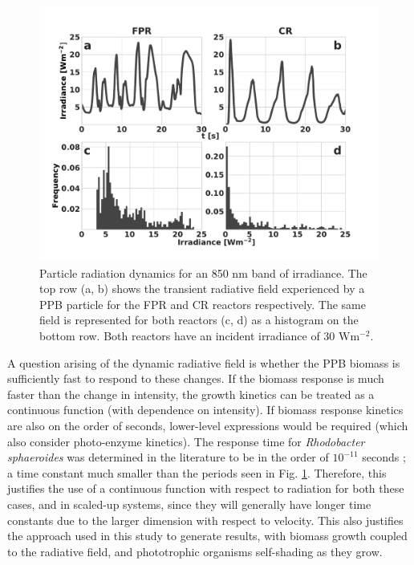 \begin{figure}[ht]
\centering
\includegraphics[width=1.\linewidth]{Images/Chap3/G850_short.pdf}
\caption{Particle radiation dynamics for an 850 nm band of irradiance. The top row (a, b) shows the transient radiative field experienced by a PPB particle for the FPR and CR reactors respectively. The same field is represented for both reactors (c, d) as a histogram on the bottom row. Both reactors have an incident irradiance of 30 $\mathrm{ W m^{-2}}$.}
\label{fig:G850_short}
\end{figure}

A question arising of the dynamic radiative field is whether the PPB biomass is sufficiently fast to respond to these changes. If the biomass response is much faster than the change in intensity, the growth kinetics can be treated as a continuous function (with dependence on intensity). If biomass response kinetics are also on the order of seconds, lower-level expressions would be required (which also consider photo-enzyme kinetics). The response time for \textit{Rhodobacter sphaeroides} was determined in the literature to be in the order of $10^{-11}$ seconds \cite{slouf2012}; a time constant much smaller than the periods seen in Fig. \ref{fig:G850_short}. Therefore, this justifies the use of a continuous function with respect to radiation for both these cases, and in scaled-up systems, since they will generally have longer time constants due to the larger dimension with respect to velocity. This also justifies the approach used in this study to generate results, with biomass growth coupled to the radiative field, and phototrophic organisms self-shading as they grow.

